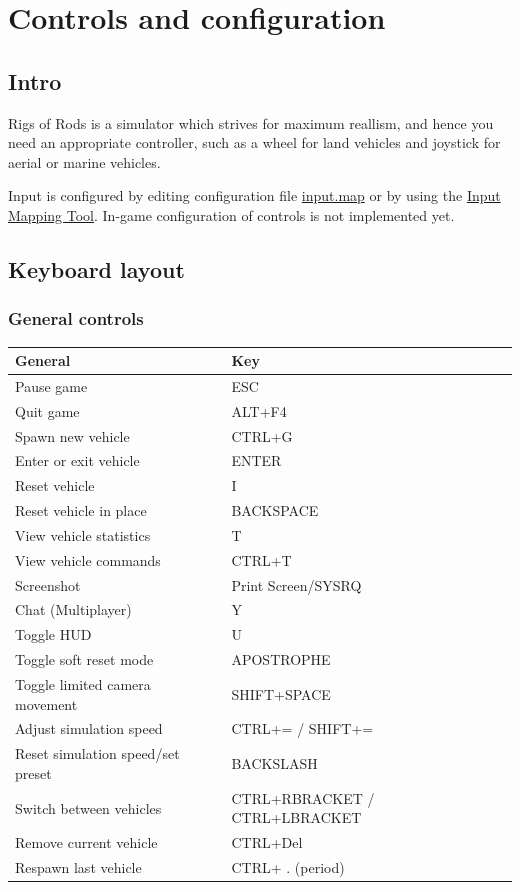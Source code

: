 \hypertarget{controls-config}{%
\chapter{Controls and configuration}\label{controls-config}}

\hypertarget{intro}{%
\section{Intro}\label{intro}}

Rigs of Rods is a simulator which strives for maximum reallism, and
hence you need an appropriate controller, such as a wheel for land
vehicles and joystick for aerial or marine vehicles.

Input is configured by editing configuration file
\protect\hyperlink{config-file-inputmap}{input.map} or by using the
\protect\hyperlink{configuring-controls-with-the-input-mapping-tool}{Input
Mapping Tool}. In-game configuration of controls is not implemented yet.

\hypertarget{keyboard-layout}{%
\section{Keyboard layout}\label{keyboard-layout}}

\hypertarget{general-controls}{%
\subsection{General controls}\label{general-controls}}

\begin{tabular}{ |l|l| } 
\hline
\textbf{General} & \textbf{Key} \\
\hline
Pause game & ESC \\
\hline
Quit game & ALT+F4 \\
\hline
Spawn new vehicle & CTRL+G \\
\hline
Enter or exit vehicle & ENTER \\
\hline
Reset vehicle & I \\
\hline
Reset vehicle in place & BACKSPACE \\
\hline
View vehicle statistics & T \\
\hline
View vehicle commands & CTRL+T \\
\hline
Screenshot & Print Screen/SYSRQ \\
\hline
Chat (Multiplayer) & Y \\
\hline
Toggle HUD & U \\
\hline
Toggle soft reset mode & APOSTROPHE \\
\hline
Toggle limited camera movement & SHIFT+SPACE \\
\hline
Adjust simulation speed & CTRL+= / SHIFT+= \\
\hline
Reset simulation speed/set preset & BACKSLASH \\
\hline
Switch between vehicles & CTRL+RBRACKET / CTRL+LBRACKET  \\
\hline
Remove current vehicle & CTRL+Del \\
\hline
Respawn last vehicle & CTRL+ . (period) \\
\hline
\end{tabular}

